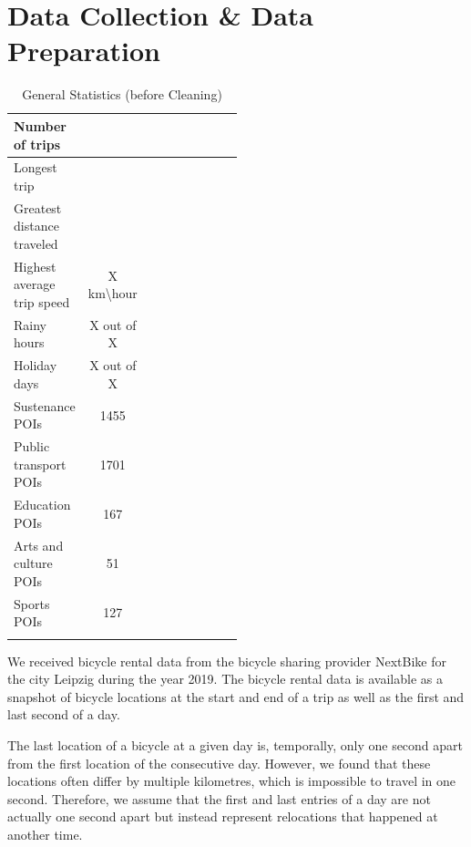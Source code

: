 \section{Data Collection \& Data Preparation}
\label{sec:data_collection_and_data_preparation}

\begin{longtable}{|l|c|p{0.5\linewidth}|c|}
    \hline
    Number of trips            &                         \\
    \hline
    Longest trip               &                         \\
    \hline
    Greatest distance traveled &                         \\
    \hline
    Highest average trip speed & X km\textbackslash hour \\
    \hline
    Rainy hours                & X out of X              \\
    \hline
    Holiday days               & X out of X              \\
    \hline
    Sustenance POIs            & 1455                    \\
    \hline
    Public transport POIs      & 1701                    \\
    \hline
    Education POIs             & 167                     \\
    \hline
    Arts and culture POIs      & 51                      \\
    \hline
    Sports POIs                & 127                     \\
    \hline
    \caption{General Statistics (before Cleaning)}
    \label{table:general_statistics}
\end{longtable}

We received bicycle rental data from the bicycle sharing provider NextBike for the city Leipzig during the year 2019.
The bicycle rental data is available as a snapshot of bicycle locations at the start and end of a trip as well as the first and last second of a day.

The last location of a bicycle at a given day is, temporally, only one second apart from the first location of the consecutive day.
However, we found that these locations often differ by multiple kilometres, which is impossible to travel in one second.
Therefore, we assume that the first and last entries of a day are not actually one second apart but instead represent relocations that happened at another time.

